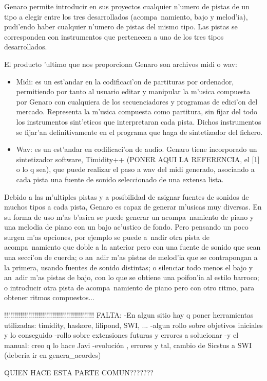 \documentclass[a4paper,12pt]{article}
\begin{document}
Genaro permite introducir en sus proyectos cualquier n'umero de pistas de un tipo a elegir entre los tres desarrollados (acompa~namiento, bajo y melod'ia), pudi'endo haber cualquier n'umero de pistas del mismo tipo. Las pistas se corresponden con instrumentos que pertenecen a uno de los tres tipos desarrollados.

El producto 'ultimo que nos proporciona Genaro son archivos midi o wav:
\begin{itemize}
\item Midi: es un est'andar en la codificaci'on de partituras por ordenador, permitiendo por tanto al usuario editar y manipular la m'usica compuesta por Genaro con cualquiera de los secuenciadores y programas de edici'on del mercado. Representa la m'usica compuesta como partitura, sin fijar del todo los instrumentos sint'eticos que interpretaran cada pista. Dichos instrumentos se fijar'an definitivamente en el programa que haga de sintetizador del fichero.
\item Wav: es un est'andar en codificaci'on de audio. Genaro tiene incorporado un sintetizador software, Timidity++ (PONER AQUI LA REFERENCIA, el [1] o lo q sea), que puede realizar el paso a wav del midi generado, asociando a cada pista una fuente de sonido seleccionado de una extensa lista.
\end{itemize}

Debido a las m'ultiples pistas y a posibilidad de asignar fuentes de sonidos de muchos tipos a cada pista, Genaro es capaz de generar m'usicas muy diversas. En su forma de uso m'as b'asica se puede generar un acompa~namiento de piano y una melodia de piano con un bajo ac'ustico de fondo. Pero pensando un poco surgen m'as opciones, por ejemplo se puede a~nadir otra pista de acompa~namiento que doble a la anterior pero con una fuente de sonido que sean una secci'on de cuerda; o an~adir m'as pistas de melod'ia que se contrapongan a la primera, usando fuentes de sonido distintas; o silenciar todo menos el bajo y an~adir m'as pistas de bajo, con lo que se obtiene una poifon'ia al estilo barroco; o introducir otra pista de acompa~namiento de piano pero con otro ritmo, para obtener ritmos compuestos...



!!!!!!!!!!!!!!!!!!!!!!!!!!!!!!!!!!!!!!!!!!!!!
FALTA:
-En algun sitio hay q poner herramientas utilizadas: timidity, haskore, lilipond, SWI, ...
-algun rollo sobre objetivos iniciales y lo conseguido
-rollo sobre extensiones futuras y errores a solucionar
-y el manual: creo q lo hace Javi
-evolución , errores y tal, cambio de Sicstus a SWI (deberia ir en genera\_acordes)

QUIEN HACE ESTA PARTE COMUN???????      
\end{document}

